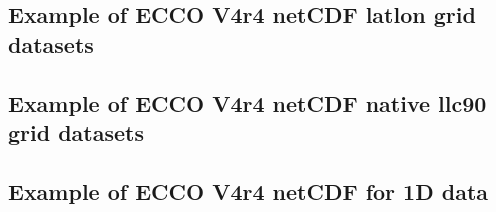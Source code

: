 \pagebreak
\subsection{Example of ECCO V4r4 netCDF latlon grid datasets}

\pagebreak
\subsection{Example of ECCO V4r4 netCDF native llc90 grid datasets}

\pagebreak
\subsection{Example of ECCO V4r4 netCDF for 1D data}


